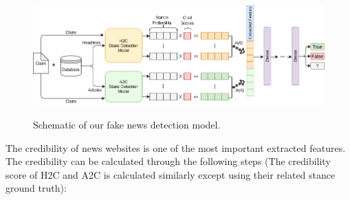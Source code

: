 \begin{figure}%
	\centering
	{\includegraphics[width=14.5cm]{statistics/schema/fn.png} }
	\caption{Schematic of our fake news detection model.}%
	\label{fig:fnschm}%
\end{figure}

The credibility of news websites is one of the most important extracted features. The credibility can be calculated through the following steps (The credibility score of \ac{H2C} and \ac{A2C} is calculated similarly except using their related stance ground truth):

